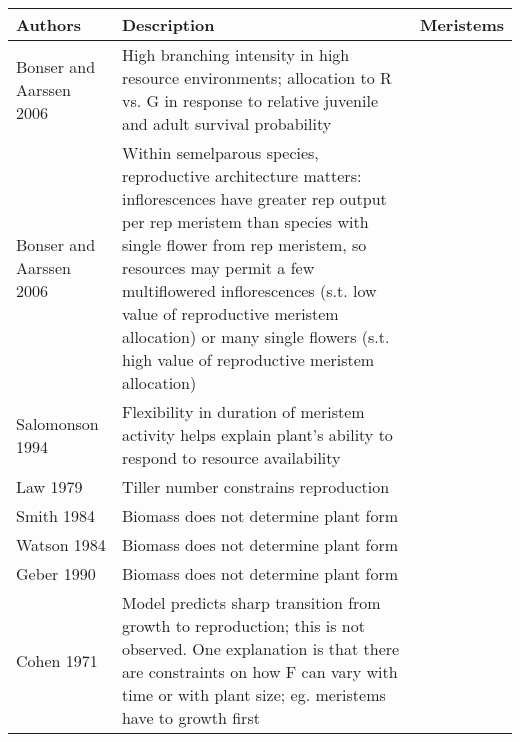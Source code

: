\documentclass[12pt, oneside]{article}   	%
\begin{document}
  \begin{tabularx}{\textwidth}{|l| >{\setlength{\baselineskip}{.5\baselineskip}}X|l|}
\hline
Authors & Description & Meristems \\ \hline

  \cite{}  Bonser and Aarssen 2006      & High branching intensity in high resource environments; allocation to R vs. G in response to relative juvenile and adult survival probability  &           \\ \hline
 \cite{}  Bonser and Aarssen 2006      & Within semelparous species, reproductive architecture matters: inflorescences have greater rep output per rep meristem than species with single flower from rep meristem, so resources may permit a few multiflowered inflorescences (s.t. low value of reproductive meristem allocation) or many single flowers (s.t. high value of reproductive meristem allocation)  &           \\ \hline

 \cite{} Salomonson 1994       & Flexibility in duration of meristem activity helps explain plant's ability to respond to resource availability    &           \\ \hline
  \cite{} Law 1979       &  Tiller number constrains reproduction   &           \\ \hline
  \cite{} Smith 1984      &  Biomass does not determine plant form   &           \\ \hline
  \cite{} Watson 1984      &  Biomass does not determine plant form   &           \\ \hline
  \cite{} Geber 1990      &  Biomass does not determine plant form   &           \\ \hline
\cite{} Cohen 1971       & Model predicts sharp transition from growth to reproduction; this is not observed. One explanation is that there are constraints on how F can vary with time or with plant size; eg. meristems have to growth first    &           \\ \hline

  \end{tabularx}
\end{document}
